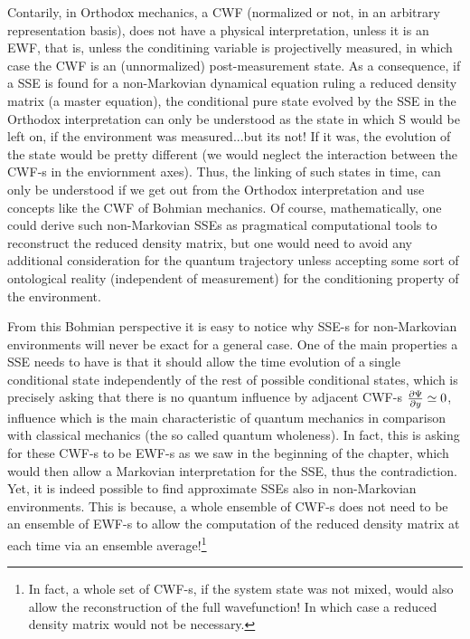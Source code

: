 \documentclass[11pt, a4paper]{article} %
\begin{document}
Contarily, in Orthodox mechanics, a CWF (normalized or not, in an arbitrary representation basis), does not have a physical interpretation, unless it is an EWF, that is, unless the conditining variable is projectivelly measured, in which case the CWF is an (unnormalized) post-measurement state. As a consequence, if a SSE is found for a non-Markovian dynamical equation ruling a reduced density matrix (a master equation), the conditional pure state evolved by the SSE in the Orthodox interpretation can only be understood as the state in which S would be left on, if the environment was measured...but its not! If it was, the evolution of the state would be pretty different (we would neglect the interaction between the CWF-s in the enviornment axes). Thus, the linking of such states in time, can only be understood if we get out from the Orthodox interpretation and use concepts like the CWF of Bohmian mechanics. Of course, mathematically, one could derive such non-Markovian SSEs as pragmatical computational tools to reconstruct the reduced density matrix, but one would need to avoid any additional consideration for the quantum trajectory unless accepting some sort of ontological reality (independent of measurement) for the conditioning property of the environment.

From this Bohmian perspective it is easy to notice why SSE-s for non-Markovian environments will never be exact for a general case. One of the main properties a SSE needs to have is that it should allow the time evolution of a single conditional state independently of the rest of possible conditional states, which is precisely asking that there is no quantum influence by adjacent CWF-s $\pdv{\Psi}{y}\simeq 0$, influence which is the main characteristic of quantum mechanics in comparison with classical mechanics (the so called quantum wholeness). In fact, this is asking for these CWF-s to be EWF-s as we saw in the beginning of the chapter, which would then allow a Markovian interpretation for the SSE, thus the contradiction. Yet, it is indeed possible to find approximate SSEs also in non-Markovian environments. This is because, a whole ensemble of CWF-s does not need to be an ensemble of EWF-s to allow the computation of the reduced density matrix at each time via an ensemble average!\footnote{In fact, a whole set of CWF-s, if the system state was not mixed, would also allow the reconstruction of the full wavefunction! In which case a reduced density matrix would not be necessary.} 
\end{document}

